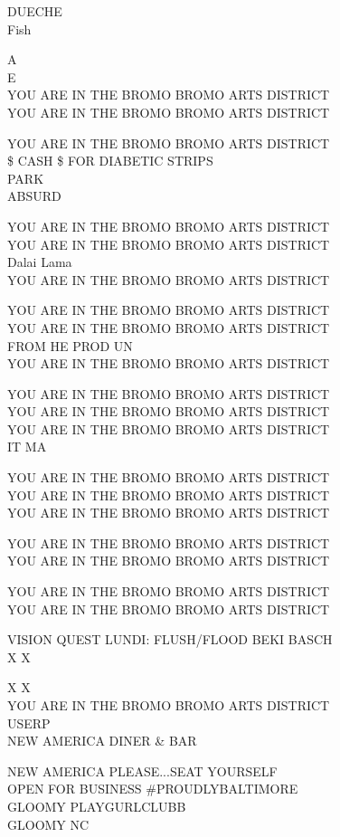 \documentclass[10pt,letterpaper]{article}
\begin{document}
DUECHE\\
Fish

A\\
E\\
YOU ARE IN THE BROMO BROMO ARTS DISTRICT\\
YOU ARE IN THE BROMO BROMO ARTS DISTRICT

YOU ARE IN THE BROMO BROMO ARTS DISTRICT\\
\$ CASH \$ FOR DIABETIC STRIPS\\
PARK\\
ABSURD

YOU ARE IN THE BROMO BROMO ARTS DISTRICT\\
YOU ARE IN THE BROMO BROMO ARTS DISTRICT\\
Dalai Lama\\
YOU ARE IN THE BROMO BROMO ARTS DISTRICT

YOU ARE IN THE BROMO BROMO ARTS DISTRICT\\
YOU ARE IN THE BROMO BROMO ARTS DISTRICT\\
FROM HE PROD UN\\
YOU ARE IN THE BROMO BROMO ARTS DISTRICT

YOU ARE IN THE BROMO BROMO ARTS DISTRICT\\
YOU ARE IN THE BROMO BROMO ARTS DISTRICT\\
YOU ARE IN THE BROMO BROMO ARTS DISTRICT\\
IT MA

YOU ARE IN THE BROMO BROMO ARTS DISTRICT\\
YOU ARE IN THE BROMO BROMO ARTS DISTRICT\\
YOU ARE IN THE BROMO BROMO ARTS DISTRICT

YOU ARE IN THE BROMO BROMO ARTS DISTRICT\\
YOU ARE IN THE BROMO BROMO ARTS DISTRICT

YOU ARE IN THE BROMO BROMO ARTS DISTRICT\\
YOU ARE IN THE BROMO BROMO ARTS DISTRICT

VISION QUEST LUNDI: FLUSH/FLOOD BEKI BASCH\\
X X

X X\\
YOU ARE IN THE BROMO BROMO ARTS DISTRICT\\
USERP\\
NEW AMERICA DINER \& BAR

NEW AMERICA PLEASE...SEAT YOURSELF\\
OPEN FOR BUSINESS \#PROUDLYBALTIMORE\\
GLOOMY PLAYGURLCLUBB\\
GLOOMY NC
\end{document}
